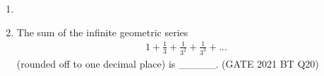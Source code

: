 \begin{enumerate}[label=\thechapter.\arabic*,ref=\thechapter.\theenumi]
\item 
\solution

\pagebreak

\item The sum of the infinite geometric series
\begin{align}
    1 + \frac{1}{3} + \frac{1}{3^2} + \frac{1}{3^3} + ... \nonumber
\end{align}
(rounded off to one decimal place) is \_\_\_\_\_.
\hfill(GATE 2021 BT Q20)\\
\solution

\pagebreak
\end{enumerate}
